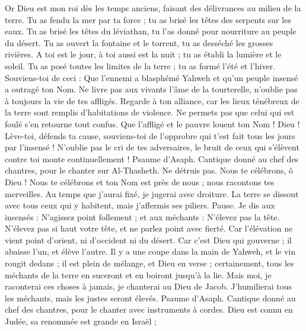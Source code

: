 \begin{multicols}{2}
Or Dieu est mon roi dès les temps anciens, faisant des délivrances au milieu de la terre.
Tu as fendu la mer par ta force ; tu as brisé les têtes des serpents sur les eaux.
Tu as brisé les têtes du léviathan, tu l'as donné pour nourriture au peuple du désert.
Tu as ouvert la fontaine et le torrent, tu as desséché les grosses rivières.
A toi est le jour, à toi aussi est la nuit ; tu as établi la lumière et le soleil.
Tu as posé toutes les limites de la terre ; tu as formé l'été et l'hiver.
Souviens-toi de ceci : Que l'ennemi a blasphémé Yahweh et qu'un peuple insensé a outragé ton Nom.
Ne livre pas aux vivants l’âme de la tourterelle, n'oublie pas à toujours la vie de tes affligés.
Regarde à ton alliance, car les lieux ténébreux de la terre sont remplis d’habitations de violence.
Ne permets pas que celui qui est foulé s'en retourne tout confus. Que l'affligé et le pauvre louent ton Nom !
Dieu ! Lève-toi, défends ta cause, souviens-toi de l'opprobre qui t'est fait tous les jours par l'insensé !
N'oublie pas le cri de tes adversaires, le bruit de ceux qui s'élèvent contre toi monte continuellement !
\VerseOne{}Psaume d'Asaph. Cantique donné au chef des chantres, pour le chanter sur Al-Thasheth. Ne détruis pas.
Nous te célébrons, ô Dieu ! Nous te célébrons et ton Nom est près de nous ; nous racontons tes merveilles.
Au temps que j’aurai fixé, je jugerai avec droiture.
La terre se dissout avec tous ceux qui y habitent, mais j'affermis ses piliers. Pause.
Je dis aux insensés : N'agissez point follement ; et aux méchants : N’élevez pas la tête.
N’élevez pas si haut votre tête, et ne parlez point avec fierté.
Car l'élévation ne vient point d'orient, ni d'occident ni du désert.
Car c'est Dieu qui gouverne ; il abaisse l'un, et élève l'autre.
Il y a une coupe dans la main de Yahweh, et le vin rougit dedans ; il est plein de mélange, et Dieu en verse ; certainement, tous les méchants de la terre en suceront et en boiront jusqu’à la lie.
Mais moi, je raconterai ces choses à jamais, je chanterai au Dieu de Jacob.
J'humilierai tous les méchants, mais les justes seront élevés.
\VerseOne{}Psaume d'Asaph. Cantique donné au chef des chantres, pour le chanter avec instruments à cordes.
Dieu est connu en Judée, sa renommée est grande en Israël ;

\end{multicols}
